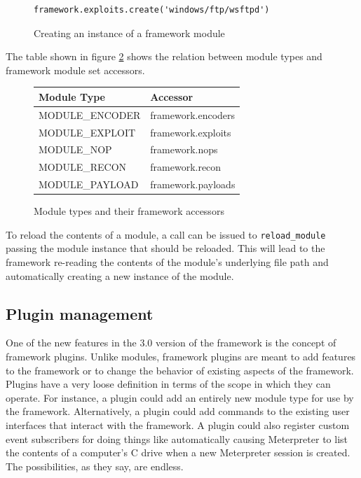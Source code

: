 \documentclass{report}
\begin{document}
\begin{figure}[h]
\begin{verbatim}
framework.exploits.create('windows/ftp/wsftpd')
\end{verbatim}
\caption{Creating an instance of a framework module}
\label{fig-code-framework-modcreate}
\end{figure}

\par
The table shown in figure \ref{fig-table-modulsets} shows the
relation between module types and framework module set accessors.

\begin{figure}[h]
\begin{center}
\begin{tabular}{|l|l|}
\hline
\textbf{Module Type} & \textbf{Accessor} \\
\hline
MODULE\_ENCODER & framework.encoders \\
MODULE\_EXPLOIT & framework.exploits \\
MODULE\_NOP & framework.nops \\
MODULE\_RECON & framework.recon \\
MODULE\_PAYLOAD & framework.payloads \\
\hline
\end{tabular}
\caption{Module types and their framework accessors}
\label{fig-table-modulsets}
\end{center}
\end{figure}

\par
To reload the contents of a module, a call can be issued to
\texttt{reload\_module} passing the module instance that should be
reloaded.  This will lead to the framework re-reading the contents
of the module's underlying file path and automatically creating a
new instance of the module.

        \subsection{Plugin management}

\par
One of the new features in the 3.0 version of the framework is the
concept of framework plugins.  Unlike modules, framework plugins are
meant to add features to the framework or to change the behavior of
existing aspects of the framework.  Plugins have a very loose
definition in terms of the scope in which they can operate.  For
instance, a plugin could add an entirely new module type for use by
the framework.  Alternatively, a plugin could add commands to the
existing user interfaces that interact with the framework.  A plugin
could also register custom event subscribers for doing things like
automatically causing Meterpreter to list the contents of a
computer's C drive when a new Meterpreter session is created.  The
possibilities, as they say, are endless.
\end{document}
